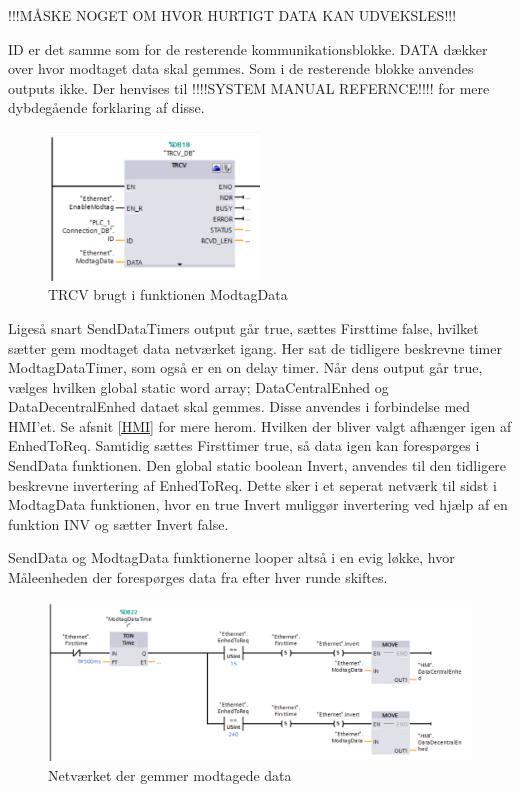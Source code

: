 !!!MÅSKE NOGET OM HVOR HURTIGT DATA KAN UDVEKSLES!!!

ID er det samme som for de resterende kommunikationsblokke. DATA dækker over hvor modtaget data skal gemmes. Som i de resterende blokke anvendes outputs ikke. Der henvises til !!!!SYSTEM MANUAL REFERNCE!!!! for mere dybdegående forklaring af disse.

\begin{figure}[H] %
	\centering
	\includegraphics[width=0.5\textwidth]{Figure/TRCV}
	\caption{TRCV brugt i funktionen ModtagData}
	\label{fig:TRCV}
\end{figure}

Ligeså snart SendDataTimers output går true, sættes Firsttime false, hvilket sætter gem modtaget data netværket igang. Her sat de tidligere beskrevne timer ModtagDataTimer, som også er en on delay timer. Når dens output går true, vælges hvilken global static word array; DataCentralEnhed og DataDecentralEnhed dataet skal gemmes. Disse anvendes i forbindelse med HMI'et. Se afsnit \ref{HMI} for mere herom. Hvilken der bliver valgt afhænger igen af EnhedToReq. Samtidig sættes Firsttimer true, så data igen kan forespørges i SendData funktionen. Den global static boolean Invert, anvendes til den tidligere beskrevne invertering af EnhedToReq. Dette sker i et seperat netværk til sidst i ModtagData funktionen, hvor en true Invert muliggør invertering ved hjælp af en funktion INV og sætter Invert false.

SendData og ModtagData funktionerne looper altså i en evig løkke, hvor Måleenheden der forespørges data fra efter hver runde skiftes.

\begin{figure}[H] %
	\centering
	\includegraphics[width=1\textwidth]{Figure/GemModtagetData}
	\caption{Netværket der gemmer modtagede data}
	\label{fig:GemModtagetdata}
\end{figure}

